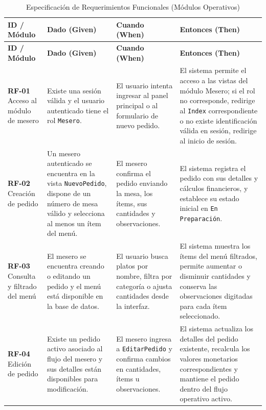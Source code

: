 \begin{longtable}{|p{2.4cm}|p{4cm}|p{4cm}|p{4.5cm}|}
	\caption{Especificación de Requerimientos Funcionales (Módulos Operativos)} \label{tab:req_funcionales_operativos} \\
	\hline
	\textbf{ID / Módulo} & \textbf{Dado (Given)} & \textbf{Cuando (When)} & \textbf{Entonces (Then)} \\
	\hline
	\endfirsthead
	
	\hline
	\textbf{ID / Módulo} & \textbf{Dado (Given)} & \textbf{Cuando (When)} & \textbf{Entonces (Then)} \\
	\hline
	\endhead
	
	\hline
	\endfoot
	
	\hline
	\endlastfoot
	
	\textbf{RF-01} \newline Acceso al módulo de mesero
	&
	Existe una sesión válida y el usuario autenticado tiene el rol \texttt{Mesero}.
	&
	El usuario intenta ingresar al panel principal o al formulario de nuevo pedido.
	&
	El sistema permite el acceso a las vistas del módulo Mesero; si el rol no corresponde, redirige al \texttt{Index} correspondiente o no existe identificación válida en sesión, redirige al inicio de sesión.
	\\
	\hline
	
	\textbf{RF-02} \newline Creación de pedido
	&
	Un mesero autenticado se encuentra en la vista \texttt{NuevoPedido}, dispone de un número de mesa válido y selecciona al menos un ítem del menú.
	&
	El mesero confirma el pedido enviando la mesa, los ítems, sus cantidades y observaciones.
	&
	El sistema registra el pedido con sus detalles y cálculos financieros, y establece su estado inicial en \texttt{En Preparación}.
	\\
	\hline
	
	\textbf{RF-03} \newline Consulta y filtrado del menú
	&
	El mesero se encuentra creando o editando un pedido y el menú está disponible en la base de datos.
	&
	El usuario busca platos por nombre, filtra por categoría o ajusta cantidades desde la interfaz.
	&
	El sistema muestra los ítems del menú filtrados, permite aumentar o disminuir cantidades y conserva las observaciones digitadas para cada ítem seleccionado.
	\\
	\hline
	
	\textbf{RF-04} \newline Edición de pedido
	&
	Existe un pedido activo asociado al flujo del mesero y sus detalles están disponibles para modificación.
	&
	El mesero ingresa a \texttt{EditarPedido} y confirma cambios en cantidades, ítems u observaciones.
	&
	El sistema actualiza los detalles del pedido existente, recalcula los valores monetarios correspondientes y mantiene el pedido dentro del flujo operativo activo.
	\\
	\hline
	

\end{longtable}
